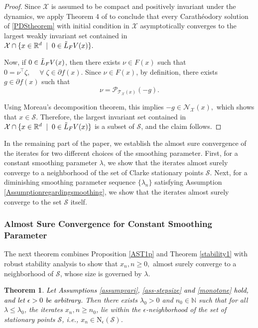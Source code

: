 \documentclass[9pt,journal,twoside,web]{ieeecolor}
\newtheorem{theorem}{Theorem}
\begin{document}
\begin{proof}
Since $\mathcal{X}$ is assumed to be compact and positively invariant under the dynamics, we apply Theorem 4 of \cite{Cortes} to conclude that every Carathéodory solution of \eqref{PDStheorem} with initial condition in  $\mathcal{X}$ asymptotically converges to the largest weakly invariant set contained in  
\\ $\mathcal{X} \cap \{x \in \mathbb{R}^d \; \; |  \; \;  0 \in \Tilde{L}_F V(x) \}.$

Now, if $0 \in  \Tilde{L}_F V(x)$, then there exists $  \nu \in F(x)$ such that 
\\ $ 0 = \nu^\top \zeta,  \; \quad \forall \; \zeta \in \partial f(x)$. 
Since $\nu \in F(x)$,  by definition, there exists $g \in \partial f(x)$ such that 
\begin{equation}
    \nu = \mathcal{P}_{\mathcal{T}_\mathcal{X}(x)} (-g). 
\end{equation}

Using Moreau’s decomposition theorem, this implies $- g \in \mathcal{N}_\mathcal{X}(x),$
which shows that $ x \in \mathcal{S}$. Therefore, the largest invariant set contained in $ \mathcal{X} \cap \{x \in \mathbb{R}^d \; \; |  \; \;  0 \in \Tilde{L}_F V(x) \}$ is a subset of $\mathcal{S}$, and the claim follows.   
\end{proof}
\color{black}
In the remaining part of the paper, we establish the almost sure convergence of the iterates for two different choices of the smoothing parameter. First, for a constant smoothing parameter $\lambda$, we show that the iterates almost surely converge to a neighborhood of the set of Clarke stationary points $\mathcal{S}$. Next, for a diminishing smoothing parameter sequence $\{\lambda_n\}$ satisfying Assumption \ref{Assumptionregardingsmoothing}, we show that the iterates almost surely converge to the set $\mathcal{S}$ itself.
\color{black}
\subsubsection{Almost Sure Convergence for Constant Smoothing Parameter}
The next theorem combines Proposition \ref{AST1p} and Theorem \ref{stability1} with robust stability analysis to show that ${x_n,n\geq 0},$ almost surely converge to a neighborhood of $\mathcal{S}$, whose size is governed by $\lambda$.
\begin{theorem}
  \textcolor{black}{ Let Assumptions \ref{assumpvari}, \ref{ass-stepsize} and \ref{monotone} hold, and let $\epsilon>0$ be arbitrary.} Then there exists $\lambda_0 > 0$ and $n_0 \in \mathbb{N}$ such that for all $\lambda \leq \lambda_0$, 
 the iterates $x_n, n\geq n_0$,	
  lie within the $\epsilon$-neighborhood of the set of stationary points $\mathcal{S}$, i.e., $x_n \in \mathrm{N}_\epsilon (\mathcal{S})$.
  \label{main Theorem1}
\end{theorem}
\end{document}
